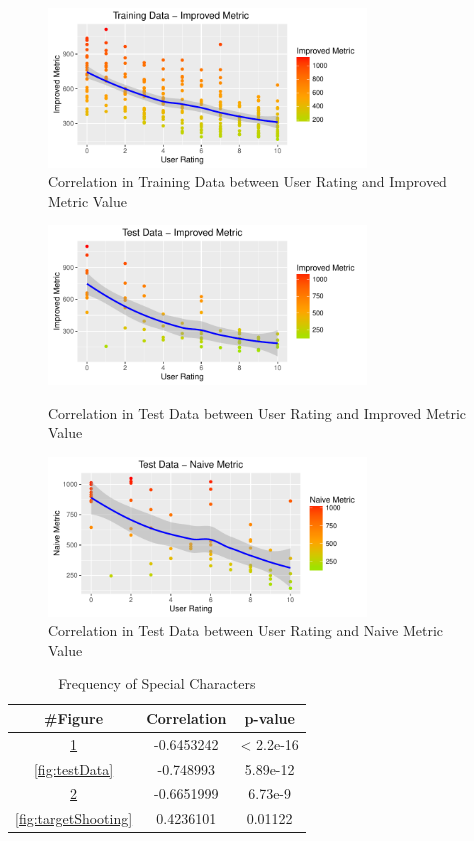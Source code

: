 \documentclass{sig-alternate-05-2015}
\begin{document}
\begin{figure}[b]
\centering
\includegraphics[width=8.45cm]{TrainingDataImproved}
\vspace{-20pt}
\caption{Correlation in Training Data between User Rating and Improved Metric Value}
\label{fig:trainingData}
\vspace{-10pt}
\end{figure}

\begin{figure}[t]
\centering
\includegraphics[width=8.45cm]{TestDataImproved}
\vspace{-20pt}
\caption{Correlation in Test Data between User Rating and Improved Metric Value}
\vspace{-10pt}
\label{fig:testData}

\includegraphics[width=8.45cm]{TestDataNaive}
\vspace{-20pt}
\caption{Correlation in Test Data between User Rating and Naive Metric Value}
\label{fig:testDataNaive}
\vspace{-20pt}
\end{figure}

\begin{table}[h]
\centering
\begin{tabular}{|c|c|c|} \hline
\#Figure & Correlation & p-value\\ \hline
\ref{fig:trainingData} & -0.6453242 & < 2.2e-16\\ \hline
\ref{fig:testData} & -0.748993 & 5.89e-12\\ \hline
\ref{fig:testDataNaive} & -0.6651999 & 6.73e-9\\ \hline
\ref{fig:targetShooting} & 0.4236101 & 0.01122\\ \hline
\end{tabular}
\caption{Frequency of Special Characters}
\label{tab:correlations}
\end{table}
\end{document}
